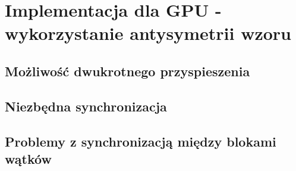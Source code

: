 
\section { Implementacja dla GPU - wykorzystanie antysymetrii wzoru }
\subsection {Możliwość dwukrotnego przyspieszenia}
\subsection {Niezbędna synchronizacja}
\subsection {Problemy z synchronizacją między blokami wątków}
